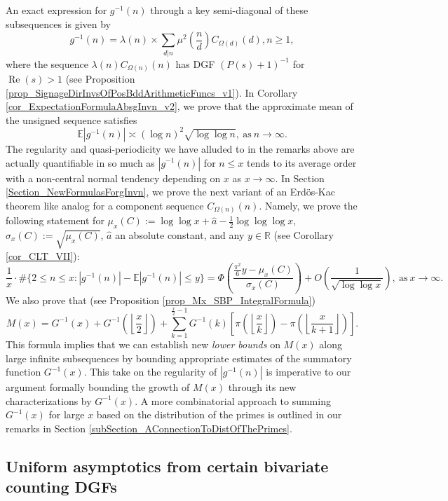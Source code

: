 \documentclass[11pt,reqno,a4letter]{article}
\numberwithin{figure}{section}
\numberwithin{table}{section}
\newcommand{\Floor}[2]{\ensuremath{\left\lfloor \frac{#1}{#2} \right\rfloor}}
\theoremstyle{plain}
\numberwithin{theorem}{section}
\theoremstyle{definition}
\renewcommand{\Re}{\operatorname{Re}}
\begin{document}
An exact expression for $g^{-1}(n)$ through a key semi-diagonal of these subsequences 
is given by 
\[
g^{-1}(n) = \lambda(n) \times \sum_{d|n} \mu^2\left(\frac{n}{d}\right) C_{\Omega(d)}(d), n \geq 1,  
\]
where the sequence $\lambda(n) C_{\Omega(n)}(n)$ has DGF $(P(s)+1)^{-1}$ for $\Re(s) > 1$ 
(see Proposition \ref{prop_SignageDirInvsOfPosBddArithmeticFuncs_v1}). 
In Corollary \ref{cor_ExpectationFormulaAbsgInvn_v2}, we prove that the approximate mean 
of the unsigned sequence satisfies 
\[
\mathbb{E}|g^{-1}(n)| \asymp (\log n)^2 \sqrt{\log\log n}, 
     \mathrm{\ as\ } n \rightarrow \infty. 
\]
The regularity and quasi-periodicity we have alluded to in the remarks above are actually 
quantifiable in so much as $|g^{-1}(n)|$ for $n \leq x$ 
tends to its average order with a non-central normal tendency 
depending on $x$ as $x \rightarrow \infty$. 
In Section \ref{Section_NewFormulasForgInvn}, 
we prove the next variant of an Erd\"os-Kac theorem like analog
for a component sequence $C_{\Omega(n)}(n)$. 
Namely, we prove the following statement for 
$\mu_x(C) := \log\log x + \hat{a} - \frac{1}{2}\log\log\log x$, $\sigma_x(C) := \sqrt{\mu_x(C)}$, 
$\hat{a}$ an absolute constant, and any $y \in \mathbb{R}$ (see 
Corollary \ref{cor_CLT_VII}): 
\[
\frac{1}{x} \cdot \#\{2 \leq n \leq x: |g^{-1}(n)| - \mathbb{E}|g^{-1}(n)| \leq y\} = 
     \Phi\left(\frac{\frac{\pi^2}{6}y - \mu_x(C)}{\sigma_x(C)}\right) + 
     O\left(\frac{1}{\sqrt{\log\log x}}\right), 
     \mathrm{\ as\ } x \rightarrow \infty. 
\]
We also prove that (see Proposition \ref{prop_Mx_SBP_IntegralFormula}) 
\begin{equation} 
\label{eqn_Mx_gInvnPixk_formula_v2} 
M(x) = G^{-1}(x) + G^{-1}\left(\Floor{x}{2}\right) + 
     \sum_{k=1}^{\frac{x}{2}-1} G^{-1}(k) \left[ 
     \pi\left(\Floor{x}{k}\right) - \pi\left(\Floor{x}{k+1}\right) 
     \right]. 
\end{equation} 
This formula 
implies that we can establish new \emph{lower bounds} on $M(x)$ along large infinite subsequences 
by bounding appropriate estimates of the summatory function $G^{-1}(x)$. 
This take on the regularity of $|g^{-1}(n)|$ is imperative to our argument formally bounding the growth 
of $M(x)$ through its new characterizations by $G^{-1}(x)$. 
A more combinatorial approach to summing $G^{-1}(x)$ for large $x$ based on the distribution of the primes 
is outlined in our remarks in Section \ref{subSection_AConnectionToDistOfThePrimes}. 

\subsection{Uniform asymptotics from certain bivariate counting DGFs} 
\end{document}
